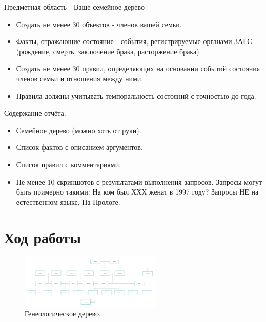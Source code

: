 \documentclass[12pt]{report}
\begin{document}
	\begin{flushleft}
		Предметная область - Ваше семейное дерево
		
		\begin{itemize}
			\item Создать не менее 30 объектов - членов вашей семьи.
			\item Факты, отражающие состояние - события, регистрируемые органами ЗАГС (рождение, смерть, заключение брака, расторжение брака).
			\item Создать не менее 30 правил, определяющих на основании событий состояния членов семьи и отношения между ними.
			\item Правила должны учитывать темпоральность состояний с точностью до года.
		\end{itemize}
		
	\end{flushleft}
	
	\begin{flushleft}
		Содержание отчёта:
		
		\begin{itemize}
			\item Семейное дерево (можно хоть от руки). 
			\item Список фактов с описанием аргументов. 
			\item Список правил с комментариями. 
			\item Не менее 10 скриншотов с результатами выполнения запросов. Запросы могут быть примерно такими: На ком был ХХХ женат в 1997 году? Запросы НЕ на естественном языке. На Прологе. 
		\end{itemize}
		
	\end{flushleft}
	
	\section*{Ход работы}
	
	\begin{figure}[htbp]
		\centering
		\includegraphics[width=0.6\textwidth]{derevo.png}
		\caption{Генеологическое дерево.}
		\label{fig:genealog_tree}
	\end{figure}
	\newpage
	
\end{document}
